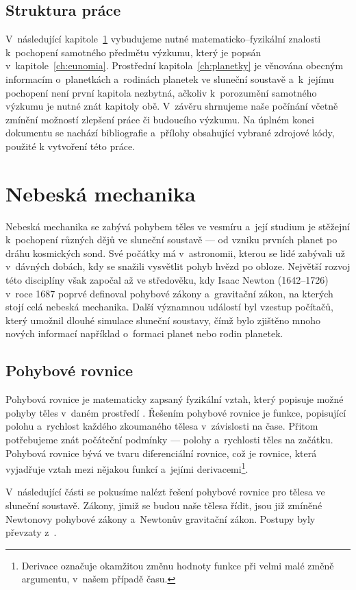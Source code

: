 \documentclass[A4paper, 12pt, oneside]{book}
\begin{document}
\section*{Struktura práce}
V~následující kapitole~\ref{ch:celmech} vybudujeme nutné matematicko--fyzikální znalosti k~pochopení samotného předmětu výzkumu, který je popsán v~kapitole~\ref{ch:eunomia}. Prostřední kapitola~\ref{ch:planetky} je věnována obecným informacím o~planetkách a~rodinách planetek ve sluneční soustavě a~k~jejímu pochopení není první kapitola nezbytná, ačkoliv k~porozumění samotného výzkumu je nutné znát kapitoly obě. V~závěru shrnujeme naše počínání včetně zmínění možností zlepšení práce či budoucího výzkumu. Na úplném konci dokumentu se nachází bibliografie a~přílohy obsahující vybrané zdrojové kódy, použité k vytvoření této práce.

\chapter{Nebeská mechanika} \label{ch:celmech}
Nebeská mechanika se zabývá pohybem těles ve vesmíru a~její studium je stěžejní k~pochopení různých dějů ve sluneční soustavě --- od vzniku prvních planet po dráhu kosmických sond. Své počátky má v~astronomii, kterou se lidé zabývali už v~dávných dobách, kdy se snažili vysvětlit pohyb hvězd po obloze. Největší rozvoj této disciplíny však započal až ve středověku, kdy Isaac Newton (1642--1726) v~roce 1687 poprvé definoval pohybové zákony a~gravitační zákon, na kterých stojí celá nebeská mechanika. Další významnou událostí byl vzestup počítačů, který umožnil dlouhé simulace sluneční soustavy, čímž bylo zjištěno mnoho nových informací například o~formaci planet nebo rodin planetek.

\section{Pohybové rovnice}
Pohybová rovnice je matematicky zapsaný fyzikální vztah, který popisuje možné pohyby těles v~daném prostředí \cite{wiki:eqm}. Řešením pohybové rovnice je funkce, popisující polohu a~rychlost každého zkoumaného tělesa v~závislosti na čase. Přitom potřebujeme znát počáteční podmínky --- polohy a~rychlosti těles na začátku. Pohybová rovnice bývá ve tvaru diferenciální rovnice, což je rovnice, která vyjadřuje vztah mezi nějakou funkcí a~jejími derivacemi\footnote{Derivace označuje okamžitou změnu hodnoty funkce při velmi malé změně argumentu, v~našem případě času.}.

V~následující části se pokusíme nalézt řešení pohybové rovnice pro tělesa ve sluneční soustavě. Zákony, jimiž se budou naše tělesa řídit, jsou již zmíněné Newtonovy pohybové zákony a~Newtonův gravitační zákon. Postupy byly převzaty z~\cite{murray00}.
\end{document}
